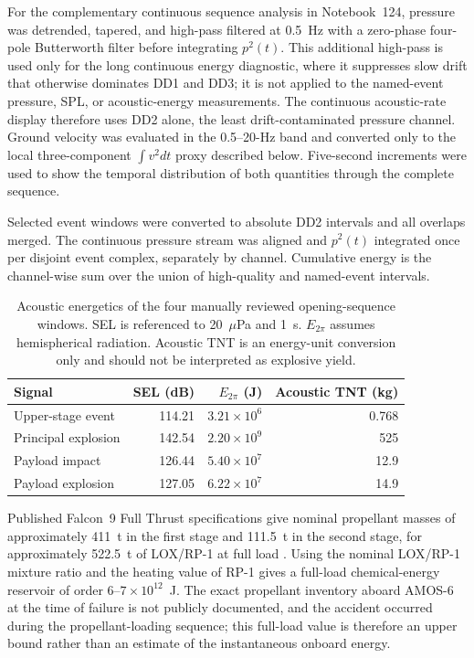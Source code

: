 \documentclass[]{seismica}
\begin{document}
For the complementary continuous sequence analysis in Notebook~124,
pressure was detrended, tapered, and high-pass filtered at 0.5~Hz with a
zero-phase four-pole Butterworth filter before integrating $p^2(t)$. This
additional high-pass is used only for the long continuous energy diagnostic,
where it suppresses slow drift that otherwise dominates DD1 and DD3; it is not
applied to the named-event pressure, SPL, or acoustic-energy measurements.
The continuous acoustic-rate display therefore uses DD2 alone, the least
drift-contaminated pressure channel. Ground velocity was evaluated in the
0.5--20-Hz band and converted only to the local three-component
$\int v^2dt$ proxy described below. Five-second increments were used to show
the temporal distribution of both quantities through the complete sequence.

Selected event windows were converted to absolute DD2 intervals and all
overlaps merged. The continuous pressure stream was aligned and $p^2(t)$
integrated once per disjoint event complex, separately by channel. Cumulative
energy is the channel-wise sum over the union of high-quality and named-event
intervals.

\begin{table}[!tbp]
\centering
\small
\caption{Acoustic energetics of the four manually reviewed opening-sequence
windows. SEL is referenced to 20~$\mu$Pa and 1~s. $E_{2\pi}$ assumes
hemispherical radiation. Acoustic TNT is an energy-unit conversion only and
should not be interpreted as explosive yield.}
\label{tab:supp_energetics}
\begin{tabularx}{\textwidth}{Xrrr}
\hline
Signal & SEL (dB) & $E_{2\pi}$ (J) & Acoustic TNT (kg) \\
\hline
Upper-stage event   & 114.21 & $3.21\times10^6$ & 0.768 \\
Principal explosion & 142.54 & $2.20\times10^9$ & 525   \\
Payload impact      & 126.44 & $5.40\times10^7$ & 12.9  \\
Payload explosion   & 127.05 & $6.22\times10^7$ & 14.9  \\
\hline
\end{tabularx}
\end{table}

Published Falcon~9 Full Thrust specifications give nominal propellant masses
of approximately 411~t in the first stage and 111.5~t in the second stage,
for approximately 522.5~t of LOX/RP-1 at full load
\citep{TODO_FALCON9_DATASHEET}. Using the nominal LOX/RP-1 mixture ratio and
the heating value of RP-1 gives a full-load chemical-energy reservoir of order
$6$--$7\times10^{12}$~J. The exact propellant inventory aboard AMOS-6 at the
time of failure is not publicly documented, and the accident occurred during
the propellant-loading sequence; this full-load value is therefore an upper
bound rather than an estimate of the instantaneous onboard energy.
\end{document}
